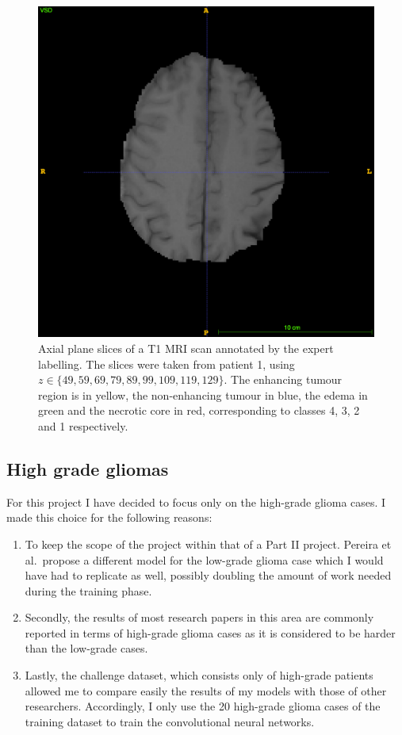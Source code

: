 \documentclass[12pt,a4paper,twoside,openright]{report}
\begin{document}
\begin{figure}
	\includegraphics[scale=0.1]{expert_segmentation_129}
	\caption[Slices of a T1 MRI scan annotated with the expert labelling.]{Axial plane slices of a T1 MRI scan annotated by the expert labelling. The slices were taken from patient 1, using $z \in \{49, 59, 69, 79, 89, 99, 109, 119, 129\}$. The enhancing tumour region is in yellow, the non-enhancing tumour in blue, the edema in green and the necrotic core in red, corresponding to classes 4, 3, 2 and 1 respectively.}
	\label{fig:expert_segmentations}
\end{figure}



\subsection{High grade gliomas}
For this project I have decided to focus only on the high-grade glioma cases. I made this choice for the following reasons:
\begin{enumerate}
	\item To keep the scope of the project within that of a Part II project. Pereira et al.\ propose a different model for the low-grade glioma case which I would have had to replicate as well, possibly doubling the amount of work needed during the training phase.
	\item Secondly, the results of most research papers in this area are commonly reported in terms of high-grade glioma cases as it is considered to be harder than the low-grade cases. 
	\item Lastly, the challenge dataset, which consists only of high-grade patients allowed me to compare easily the results of my models with those of other researchers. Accordingly, I only use the 20 high-grade glioma cases of the training dataset to train the convolutional neural networks.
\end{enumerate}
\end{document}
